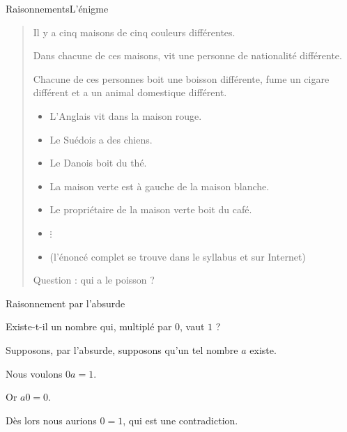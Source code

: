 \documentclass[french,xcolor=svgnames]{beamer}
\begin{document}
\begin{frame}{Raisonnements}{L'énigme}
  \begin{quote}
    Il y a cinq maisons de cinq couleurs différentes.\pause{}

    Dans chacune de ces maisons, vit une personne de nationalité différente.\pause{}

    Chacune de ces personnes boit une boisson différente, fume un cigare différent et a un animal domestique différent.\pause{}
    \begin{itemize}[<+->]
    \item L'Anglais vit dans la maison rouge.
    \item Le Suédois a des chiens.
    \item Le Danois boit du thé.
    \item La maison verte est à gauche de la maison blanche.
    \item Le propriétaire de la maison verte boit du café.
    \item \(\vdots\)
    \item (l'énoncé complet se trouve dans le syllabus et sur Internet)
    \end{itemize}\pause{}
    Question :\pause{} qui a le poisson ?
  \end{quote}
\end{frame}

\begin{frame}{Raisonnement par l'absurde}
  \begin{question}
    Existe-t-il un nombre qui, multiplé par \(0\), vaut \(1\) ?
  \end{question}\pause

  \begin{example}
    Supposons, par l'absurde, supposons qu'un tel nombre \(a\) existe.\pause{}

    Nous voulons $0a = 1$.\pause{}

    Or \(a0 = 0\).\pause{}

    Dès lors nous aurions \(0 = 1\)\pause{}, qui est une contradiction.\pause{}
  \end{example}
\end{frame}

\end{document}
